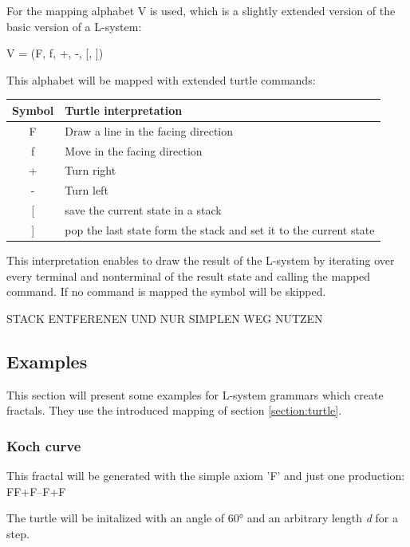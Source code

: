 \documentclass[english]{cpp-hmwk}
\begin{document}
\noindent For the mapping alphabet V is used, which is a slightly extended version of the basic version of a L-system:

\begin{center}
V = (F, f, +, -, [,  ])
\end{center}

This alphabet will be mapped with extended turtle commands:

\begin{center}
\begin{tabular}{ c l }
Symbol & Turtle interpretation \\
\hline
F & Draw a line in the facing direction  \\ 
f & Move in the facing direction  \\  
+& Turn right  \\  
-& Turn left  \\  
{[} & save the current state in a stack  \\  
{]} & pop the last state form the stack and set it to the current state  \\

\end{tabular}
\end{center}

This interpretation enables to draw the result of the L-system by iterating over every terminal and nonterminal of the result state and calling the mapped command. If no command is mapped the symbol will be skipped.

\bigskip

STACK ENTFERENEN UND NUR SIMPLEN WEG NUTZEN

\bigskip

\subsection{Examples}
This section will present some examples for L-system grammars which create fractals. They use the introduced mapping of section \ref{section:turtle}.
  
\subsubsection{Koch curve}
This fractal will be generated with the simple axiom 'F' and just one production: F\rightarrow F+F--F+F 

\noindent The turtle will be initalized with an angle of 60° and an arbitrary length \textit{d} for a step.
\end{document}

